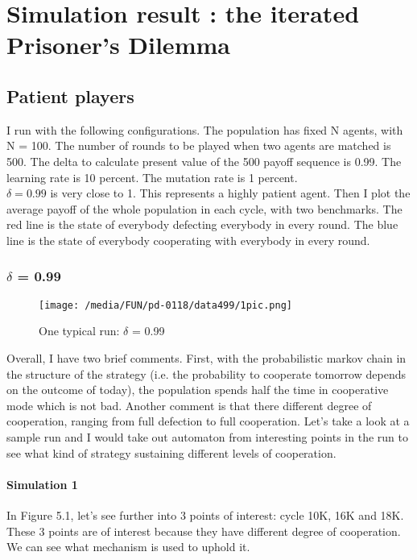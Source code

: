 \documentclass[12.5pt]{report}
\begin{document}
\chapter{Simulation result : the iterated Prisoner's Dilemma}

\section{Patient players}
I run with the following configurations. The population has fixed N agents, with N = 100. The number of rounds to be played when two agents are matched is 500. The delta to calculate present value of the 500 payoff sequence is 0.99. The learning rate is 10 percent. The mutation rate is 1 percent.\\

$\delta = 0.99$ is very close to 1. This represents a highly patient agent. Then I plot the average payoff of the whole population in each cycle, with two benchmarks. The red line is the state of everybody defecting everybody in every round. The blue line is the state of everybody cooperating with everybody in every round.

\subsection{$\delta$ = 0.99}

\begin{figure}[h!]
\center
\texttt{[image: /media/FUN/pd-0118/data499/1pic.png]}
\caption{One typical run: $\delta$ = 0.99}
\end{figure}

Overall, I have two brief comments. First, with the probabilistic markov chain in the structure of the strategy (i.e. the probability to cooperate tomorrow depends on the outcome of today), the population spends half the time in cooperative mode which is not bad. Another comment is that there different degree of cooperation, ranging from full defection to full cooperation. Let's take a look at a sample run and I would take out automaton from interesting points in the run to see what kind of strategy sustaining different levels of cooperation.

\subsubsection{Simulation 1}
In Figure 5.1, let's see further into 3 points of interest: cycle 10K, 16K and 18K. These 3 points are of interest because they have different degree of cooperation. We can see what mechanism is used to uphold it.
\end{document}
